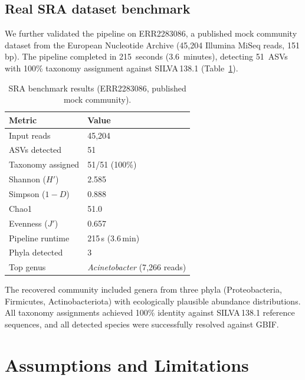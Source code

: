 \documentclass[11pt, a4paper]{article}
\begin{document}
\subsection{Real SRA dataset benchmark}

We further validated the pipeline on ERR2283086, a published mock
community dataset from the European Nucleotide Archive (45{,}204
Illumina MiSeq reads, 151\,bp). The pipeline completed in
215~seconds (3.6~minutes), detecting 51~ASVs with 100\% taxonomy
assignment against SILVA\,138.1 (Table~\ref{tab:sra}).

\begin{table}[H]
    \centering
    \caption{SRA benchmark results (ERR2283086, published mock
    community).}
    \label{tab:sra}
    \small
    \begin{tabular}{ll}
        \toprule
        \textbf{Metric} & \textbf{Value} \\
        \midrule
        Input reads         & 45{,}204 \\
        ASVs detected       & 51 \\
        Taxonomy assigned   & 51/51 (100\%) \\
        Shannon ($H'$)      & 2.585 \\
        Simpson ($1-D$)     & 0.888 \\
        Chao1               & 51.0 \\
        Evenness ($J'$)     & 0.657 \\
        Pipeline runtime    & 215\,s (3.6\,min) \\
        Phyla detected      & 3 \\
        Top genus           & \textit{Acinetobacter} (7{,}266 reads) \\
        \bottomrule
    \end{tabular}
\end{table}

The recovered community included genera from three phyla
(Proteobacteria, Firmicutes, Actinobacteriota) with ecologically
plausible abundance distributions. All taxonomy assignments achieved
100\% identity against SILVA\,138.1 reference sequences, and all
detected species were successfully resolved against GBIF.


\section{Assumptions and Limitations}
\end{document}
